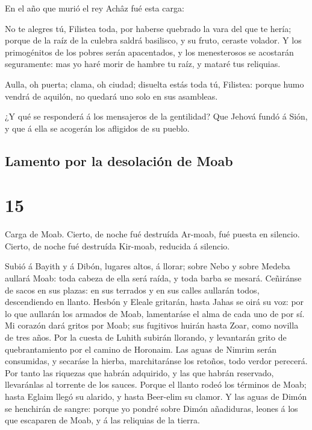  En el año que murió el rey Achâz fué esta carga:

 No te alegres tú, Filistea toda, por haberse quebrado la
vara del que te hería; porque de la raíz de la culebra saldrá basilisco,
y su fruto, ceraste volador.  Y los primogénitos de los
pobres serán apacentados, y los menesterosos se acostarán seguramente:
mas yo haré morir de hambre tu raíz, y mataré tus reliquias.

 Aulla, oh puerta; clama, oh ciudad; disuelta estás toda
tú, Filistea: porque humo vendrá de aquilón, no quedará uno solo en sus
asambleas.

 ¿Y qué se responderá á los mensajeros de la gentilidad?
Que Jehová fundó á Sión, y que á ella se acogerán los afligidos de su
pueblo.

\hypertarget{lamento-por-la-desolaciuxf3n-de-moab}{%
\subsection{Lamento por la desolación de
Moab}\label{lamento-por-la-desolaciuxf3n-de-moab}}

\hypertarget{section-14}{%
\section{15}\label{section-14}}

 Carga de Moab. Cierto, de noche fué destruída Ar-moab, fué
puesta en silencio. Cierto, de noche fué destruída Kir-moab, reducida á
silencio.

 Subió á Bayith y á Dibón, lugares altos, á llorar; sobre
Nebo y sobre Medeba aullará Moab: toda cabeza de ella será raída, y toda
barba se mesará.  Ceñiránse de sacos en sus plazas: en sus
terrados y en sus calles aullarán todos, descendiendo en llanto.
 Hesbón y Eleale gritarán, hasta Jahas se oirá su voz: por
lo que aullarán los armados de Moab, lamentaráse el alma de cada uno de
por sí.  Mi corazón dará gritos por Moab; sus fugitivos
huirán hasta Zoar, como novilla de tres años. Por la cuesta de Luhith
subirán llorando, y levantarán grito de quebrantamiento por el camino de
Horonaim.  Las aguas de Nimrim serán consumidas, y secaráse
la hierba, marchitaránse los retoños, todo verdor perecerá. 
Por tanto las riquezas que habrán adquirido, y las que habrán reservado,
llevaránlas al torrente de los sauces.  Porque el llanto
rodeó los términos de Moab; hasta Eglaim llegó su alarido, y hasta
Beer-elim su clamor.  Y las aguas de Dimón se henchirán de
sangre: porque yo pondré sobre Dimón añadiduras, leones á los que
escaparen de Moab, y á las reliquias de la tierra.

